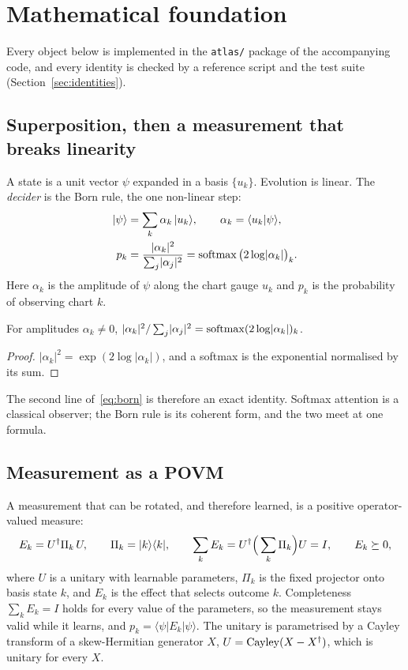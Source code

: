 \section{Mathematical foundation}\label{sec:maths}

Every object below is implemented in the \texttt{atlas/} package of the accompanying code, and every identity is checked by a reference script and the test suite (Section~\ref{sec:identities}).

\subsection{Superposition, then a measurement that breaks linearity}

A state is a unit vector $\psi$ expanded in a basis $\{u_k\}$. Evolution is linear. The \emph{decider} is the Born rule, the one non-linear step:
\begin{align}
  \lvert \psi\rangle &= \sum_k \alpha_k\,\lvert u_k\rangle, \qquad \alpha_k=\langle u_k\vert \psi\rangle, \label{eq:superposition}\\
  p_k &= \frac{\lvert\alpha_k\rvert^2}{\sum_j\lvert\alpha_j\rvert^2} = \operatorname{softmax}\big(2\log\lvert\alpha_k\rvert\big)_k. \label{eq:born}
\end{align}
Here $\alpha_k$ is the amplitude of $\psi$ along the chart gauge $u_k$ and $p_k$ is the probability of observing chart $k$.

\begin{proposition}\label{prop:born}
For amplitudes $\alpha_k\neq 0$, $\lvert\alpha_k\rvert^2/\sum_j\lvert\alpha_j\rvert^2=\operatorname{softmax}(2\log\lvert\alpha_k\rvert)_k$.
\end{proposition}
\begin{proof}
$\lvert\alpha_k\rvert^2=\exp(2\log\lvert\alpha_k\rvert)$, and a softmax is the exponential normalised by its sum.
\end{proof}

The second line of~\eqref{eq:born} is therefore an exact identity. Softmax attention is a classical observer; the Born rule is its coherent form, and the two meet at one formula.

\subsection{Measurement as a POVM}

A measurement that can be rotated, and therefore learned, is a positive operator-valued measure:
\begin{equation}\label{eq:povm}
  E_k=U^\dagger \Pi_k\, U,\qquad \Pi_k=\lvert k\rangle\langle k\rvert,\qquad \sum_k E_k=U^\dagger\Big(\sum_k\Pi_k\Big)U=I,\qquad E_k\succeq 0,
\end{equation}
where $U$ is a unitary with learnable parameters, $\Pi_k$ is the fixed projector onto basis state $k$, and $E_k$ is the effect that selects outcome $k$. Completeness $\sum_k E_k=I$ holds for every value of the parameters, so the measurement stays valid while it learns, and $p_k=\langle\psi|E_k|\psi\rangle$. The unitary is parametrised by a Cayley transform of a skew-Hermitian generator $X$, $U=\operatorname{Cayley}(X-X^\dagger)$, which is unitary for every $X$.

